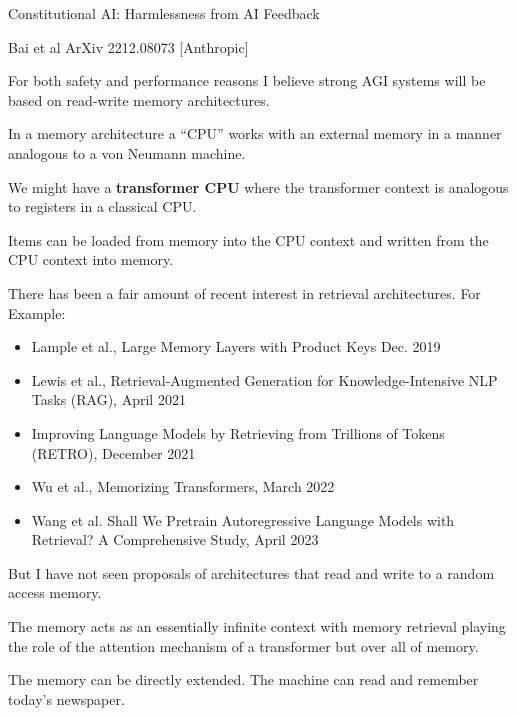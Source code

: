{\centerline{\huge Constitutional AI: Harmlessness from AI Feedback}
\centerline{\huge Bai et al ArXiv 2212.08073 [Anthropic]}


For both safety and performance reasons I believe strong AGI systems will be based on read-write memory architectures.

\vfill
In a memory architecture a ``CPU'' works with an external memory in a manner analogous to a von Neumann machine.

\vfill
We might have a {\bf transformer CPU} where the transformer context is analogous to registers in a classical CPU.

\vfill
Items can be loaded from memory into the CPU context and written from the CPU context into memory.


There has been a fair amount of recent interest in retrieval architectures.  For Example:

{\huge
\begin{itemize}
\item Lample et al., Large Memory Layers with Product Keys  Dec. 2019

\item Lewis et al., Retrieval-Augmented Generation for Knowledge-Intensive NLP Tasks (RAG), April 2021

\item Improving Language Models by Retrieving from Trillions of Tokens (RETRO), December 2021

\item Wu et al., Memorizing Transformers, March 2022

\item Wang et al. Shall We Pretrain Autoregressive Language Models with Retrieval? A Comprehensive Study, April 2023
\end{itemize}
}

But I have not seen proposals of architectures that read and write to a random access memory.


The memory acts as an essentially infinite context with memory retrieval playing the role of the attention mechanism of a transformer
but over all of memory.

\vfill
The memory can be directly extended. The machine can read and remember today's newspaper.

}
